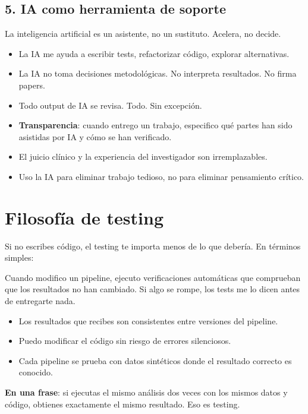 \documentclass[11pt]{article}
\begin{document}
\subsection*{5. IA como herramienta de soporte}

La inteligencia artificial es un asistente, no un sustituto. Acelera, no decide.

\begin{itemize}[label=\textendash]
  \item La IA me ayuda a escribir tests, refactorizar código, explorar alternativas.
  \item La IA no toma decisiones metodológicas. No interpreta resultados. No firma papers.
  \item Todo output de IA se revisa. Todo. Sin excepción.
  \item \textbf{Transparencia}: cuando entrego un trabajo, especifico qué partes han sido asistidas por IA y cómo se han verificado.
  \item El juicio clínico y la experiencia del investigador son irremplazables.
  \item Uso la IA para eliminar trabajo tedioso, no para eliminar pensamiento crítico.
\end{itemize}

\section*{Filosofía de testing}

Si no escribes código, el testing te importa menos de lo que debería. En términos simples:

Cuando modifico un pipeline, ejecuto verificaciones automáticas que comprueban que los resultados no han cambiado. Si algo se rompe, los tests me lo dicen antes de entregarte nada.

\begin{itemize}[label=\textendash]
  \item Los resultados que recibes son consistentes entre versiones del pipeline.
  \item Puedo modificar el código sin riesgo de errores silenciosos.
  \item Cada pipeline se prueba con datos sintéticos donde el resultado correcto es conocido.
\end{itemize}

\textbf{En una frase}: si ejecutas el mismo análisis dos veces con los mismos datos y código, obtienes exactamente el mismo resultado. Eso es testing.
\end{document}
